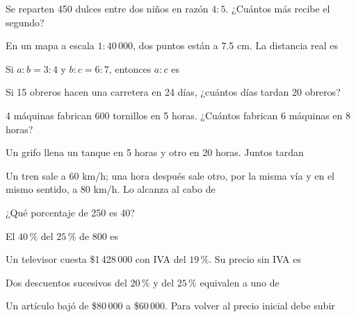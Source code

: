 \evaluacion
\begin{ejercicios}
\item Se reparten 450 dulces entre dos niños en razón $4 : 5$. ¿Cuántos más recibe el segundo?
\item En un mapa a escala $1 : 40\,000$, dos puntos están a 7.5 cm. La distancia real es
\item Si $a : b = 3 : 4$ y $b : c = 6 : 7$, entonces $a : c$ es
\item Si 15 obreros hacen una carretera en 24 días, ¿cuántos días tardan 20 obreros?
\item 4 máquinas fabrican 600 tornillos en 5 horas. ¿Cuántos fabrican 6 máquinas en 8 horas?
\item Un grifo llena un tanque en 5 horas y otro en 20 horas. Juntos tardan
\item Un tren sale a 60 km/h; una hora después sale otro, por la misma vía y en el mismo sentido, a 80 km/h. Lo alcanza al cabo de
\item ¿Qué porcentaje de 250 es 40?
\item El $40\,\%$ del $25\,\%$ de 800 es
\item Un televisor cuesta \$1\,428\,000 con IVA del $19\,\%$. Su precio sin IVA es
\item Dos descuentos sucesivos del $20\,\%$ y del $25\,\%$ equivalen a uno de
\item Un artículo bajó de \$80\,000 a \$60\,000. Para volver al precio inicial debe subir
\end{ejercicios}
